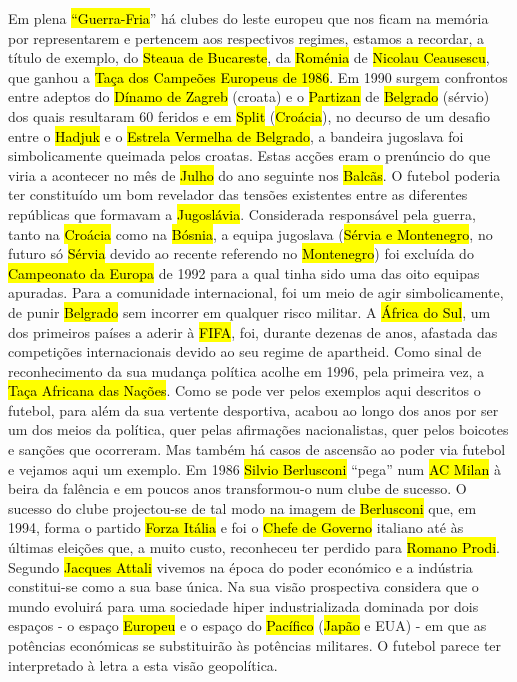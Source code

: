 \documentclass[a4paper,12pt]{article}
\begin{document}
 Em plena \hl{“Guerra-Fria}” há clubes do leste europeu que nos ficam na memória por representarem e pertencem aos respectivos regimes, estamos a recordar, a título de exemplo, do \hl{Steaua de Bucareste}, da \hl{Roménia} de \hl{Nicolau Ceausescu}, que ganhou a \hl{Taça dos Campeões Europeus de 1986}.
 Em 1990 surgem confrontos entre adeptos do \hl{Dínamo de Zagreb} (croata) e o \hl{Partizan} de \hl{Belgrado} (sérvio) dos quais resultaram 60 feridos e em \hl{Split} (\hl{Croácia}), no decurso de um desafio entre o \hl{Hadjuk} e o \hl{Estrela Vermelha de Belgrado}, a bandeira jugoslava foi simbolicamente queimada pelos croatas. Estas acções eram o prenúncio do que viria a acontecer no mês de \hl{Julho} do ano seguinte nos \hl{Balcãs}. O futebol poderia ter constituído um bom revelador das tensões existentes entre as diferentes repúblicas que formavam a \hl{Jugoslávia}. Considerada responsável pela guerra, tanto na \hl{Croácia} como na \hl{Bósnia}, a equipa jugoslava (\hl{Sérvia e Montenegro}, no futuro só \hl{Sérvia} devido ao recente referendo no \hl{Montenegro}) foi excluída do \hl{Campeonato da Europa} de 1992 para a qual tinha sido uma das oito equipas apuradas. Para a comunidade internacional, foi um meio de agir simbolicamente, de punir \hl{Belgrado} sem incorrer em qualquer risco militar.
 A \hl{África do Sul}, um dos primeiros países a aderir à \hl{FIFA}, foi, durante dezenas de anos, afastada das competições internacionais devido ao seu regime de apartheid. Como sinal de reconhecimento da sua mudança política acolhe em 1996, pela primeira vez, a \hl{Taça Africana das Nações}.
 Como se pode ver pelos exemplos aqui descritos o futebol, para além da sua vertente desportiva, acabou ao longo dos anos por ser um dos meios da política, quer pelas afirmações nacionalistas, quer pelos boicotes e sanções que ocorreram. Mas também há casos de ascensão ao poder via futebol e vejamos aqui um exemplo. Em 1986 \hl{Silvio Berlusconi} “pega” num \hl{AC Milan} à beira da falência e em poucos anos transformou-o num clube de sucesso. O sucesso do clube projectou-se de tal modo na imagem de \hl{Berlusconi} que, em 1994, forma o partido \hl{Forza Itália} e foi o \hl{Chefe de Governo} italiano até às últimas eleições que, a muito custo, reconheceu ter perdido para \hl{Romano Prodi}.
 Segundo \hl{Jacques Attali} vivemos na época do poder económico e a indústria constitui-se como a sua base única. Na sua visão prospectiva considera que o mundo evoluirá para uma sociedade hiper industrializada dominada por dois espaços - o espaço \hl{Europeu} e o espaço do \hl{Pacífico} (\hl{Japão} e EUA) - em que as potências económicas se substituirão às potências militares. O futebol parece ter interpretado à letra a esta visão geopolítica.
\end{document}
